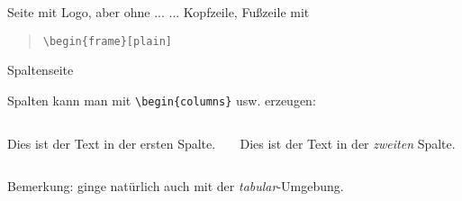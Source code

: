 \documentclass{beamer}           %
\begin{document}
\begin{frame}[plain]{Seite mit Logo, aber ohne ...}
   ... Kopfzeile, Fußzeile mit
   \begin{quote}
   {\tt \textbackslash begin\{frame\}[plain]}
   \end{quote}

\end{frame}




\begin{frame}{Spaltenseite}

  Spalten kann man mit {\tt \textbackslash begin\{columns\}} usw. erzeugen:
  \vspace{2ex}
   \begin{columns}
      \begin{column}{.4\textwidth}
         Dies ist der Text in der ersten Spalte.
      \end{column}
      \begin{column}{.4\textwidth}
         Dies ist der Text in der \emph{zweiten} Spalte.
      \end{column}
   \end{columns}
   \vspace{4ex}
   Bemerkung: ginge natürlich auch mit der {\em tabular}-Umgebung.
   

\end{frame}
\end{document}
